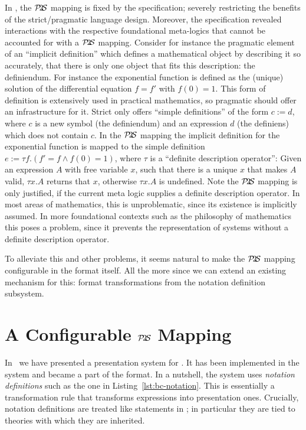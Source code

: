 \documentclass{article}
\def\ptos{\ensuremath{\mathcal{P}\kern-.2em2\kern-.2em\mathcal{S}}}
\begin{document}
In {}, the {\ptos} mapping is fixed by the specification; severely restricting
the benefits of the strict/pragmatic language design. Moreover, the specification revealed
interactions with the respective foundational meta-logics that cannot be accounted for
with a {\ptos} mapping. Consider for instance the pragmatic element of an ``implicit
definition'' which defines a mathematical object by describing it so accurately, that
there is only one object that fits this description: the definiendum. For instance the
exponential function is defined as the (unique) solution of the differential equation
$f=f'$ with $f(0)=1$. This form of definition is extensively used in practical
mathematics, so pragmatic {\omdoc} should offer an infrastructure for it. Strict {\omdoc}
only offers ``simple definitions'' of the form $c:=d$, where $c$ is a new symbol (the
definiendum) and an expression $d$ (the definiens) which does not contain $c$. In the
{} $\ptos$ mapping the implicit definition for the exponential function is
mapped to the simple definition $e:=\tau f.(f'=f\wedge f(0)=1)$, where $\tau$ is a
``definite description operator'': Given an expression $A$ with free variable $x$, such
that there is a unique $x$ that makes $A$ valid, $\tau x.A$ returns that $x$, otherwise
$\tau x.A$ is undefined. Note the {\ptos} mapping is only justified, if the current meta
logic supplies a definite description operator. In most areas of mathematics, this is
unproblematic, since its existence is implicitly assumed. In more foundational contexts
such as the philosophy of mathematics this poses a problem, since it prevents the
representation of systems without a definite description operator.

To alleviate this and other problems, it seems natural to make the {\ptos} mapping
configurable in the {} format itself. All the more since we can extend an existing
{} mechanism for this: format transformations from the notation definition
subsystem.

\section{A Configurable {\ptos} Mapping}\label{sec:main}

In~\cite{KMR:NoLMD08} we have presented a presentation system for {\omdoc}. It has been
implemented in the {\jomdoc} system and became a part of the {} format. In a
nutshell, the system uses {\emph{notation definitions}} such as the one in
Listing~\ref{lst:bc-notation}. This is essentially a transformation rule that transforms
{\openmath} expressions into presentation {\mathml} ones. Crucially, notation definitions
are treated like statements in {\omdoc}; in particular they are tied to theories with
which they are inherited.
\end{document}
